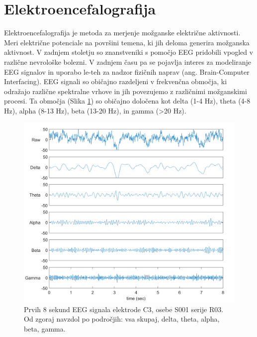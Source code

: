 \section{Elektroencefalografija}
Elektroencefalografija je metoda za merjenje možganske električne aktivnosti. Meri električne potenciale na površini temena, ki jih deloma generira možganska aktivnost. V zadnjem stoletju so znanstveniki s pomočjo EEG pridobili vpogled v različne nevrološke bolezni. V zadnjem času pa se pojavlja interes za modeliranje EEG signalov in uporabo le-teh za nadzor fizičnih naprav (ang. Brain-Computer Interfacing). EEG signali so običajno razdeljeni v frekvenčna območja, ki odražajo različne spektralne vrhove in jih povezujemo z različnimi možganskimi procesi. Ta območja (Slika \ref{slika:eeg}) so običajno določena kot delta (1-4 Hz), theta (4-8 Hz), alpha (8-13 Hz), beta (13-20 Hz), in gamma (>20 Hz).
 \cite{nunezElectroencephalographyEEGNeurophysics2016}
 \begin{figure}[h]
    \begin{center}
    \includegraphics[width=1\linewidth]{slike/EEGSignals.png}
    \end{center}
    \caption[Frekvenčna območja EEG signala.]{Prvih 8 sekund EEG signala elektrode C3, osebe S001 serije R03. Od zgoraj navzdol po področjih: vsa skupaj, delta, theta, alpha, beta, gamma.}
    \label{slika:eeg}
    \end{figure}


